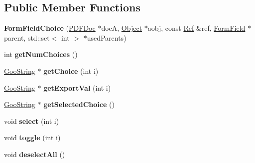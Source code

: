 \subsection*{Public Member Functions}
\begin{DoxyCompactItemize}
\item 
\mbox{\label{class_form_field_choice_afeb7b17c172aeca4d19696fa5bae71de}} 
{\bfseries Form\+Field\+Choice} (\hyperlink{class_p_d_f_doc}{P\+D\+F\+Doc} $\ast$docA, \hyperlink{class_object}{Object} $\ast$aobj, const \hyperlink{struct_ref}{Ref} \&ref, \hyperlink{class_form_field}{Form\+Field} $\ast$parent, std\+::set$<$ int $>$ $\ast$used\+Parents)
\item 
\mbox{\label{class_form_field_choice_a957624fb237a5c6f80356daf8eb64931}} 
int {\bfseries get\+Num\+Choices} ()
\item 
\mbox{\label{class_form_field_choice_ae551ce29713727fa7383dabf0616fe53}} 
\hyperlink{class_goo_string}{Goo\+String} $\ast$ {\bfseries get\+Choice} (int i)
\item 
\mbox{\label{class_form_field_choice_a89ac0f922eb1de918783b6934f8f0182}} 
\hyperlink{class_goo_string}{Goo\+String} $\ast$ {\bfseries get\+Export\+Val} (int i)
\item 
\mbox{\label{class_form_field_choice_a345f0b8a3233a5f0377332f97b655e65}} 
\hyperlink{class_goo_string}{Goo\+String} $\ast$ {\bfseries get\+Selected\+Choice} ()
\item 
\mbox{\label{class_form_field_choice_ae0c0dc9ce509b500c2a5798f1c091181}} 
void {\bfseries select} (int i)
\item 
\mbox{\label{class_form_field_choice_a7070a29b36f0c5122eca0dc9420f0bd7}} 
void {\bfseries toggle} (int i)
\item 
\mbox{\label{class_form_field_choice_ae21c547ba261d290c458189f948a104c}} 
void {\bfseries deselect\+All} ()
\item 
\mbox{\label{class_form_field_choice_a35fd21be85cd9e50490cb9e20bc6398a}} 

\end{DoxyCompactItemize}
